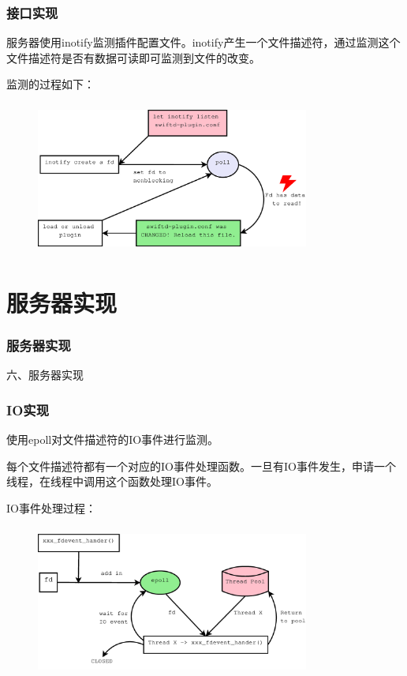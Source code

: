 \documentclass[10pt,dvipdfm]{beamer}
\begin{document}
\begin{frame}
	\frametitle{接口实现}
	服务器使用inotify监测插件配置文件。inotify产生一个文件描述符，通过监测这个文件描述符是否有数据可读即可监测到文件的改变。
	\begin{block}{监测的过程如下：}
	\begin{figure}[htbp]
	\centering
	\includegraphics[height=5cm, width=9cm]{pics/inotify.eps}
	\end{figure}
	\end{block}
\end{frame}

\section{服务器实现}

\begin{frame}
	\frametitle{服务器实现}
	\begin{center}
	{\Large
		六、服务器实现
	}
	\end{center}
\end{frame}

\begin{frame}
	\frametitle{IO实现}
	使用epoll对文件描述符的IO事件进行监测。
	
	
	每个文件描述符都有一个对应的IO事件处理函数。一旦有IO事件发生，申请一个线程，在线程中调用这个函数处理IO事件。
	\pause
	\begin{block}{IO事件处理过程：}
	\begin{figure}[htbp]
	\centering
	\includegraphics[height=5cm, width=9cm]{pics/epoll.eps}
	\end{figure}
	\end{block}
	
\end{frame}
\end{document}
